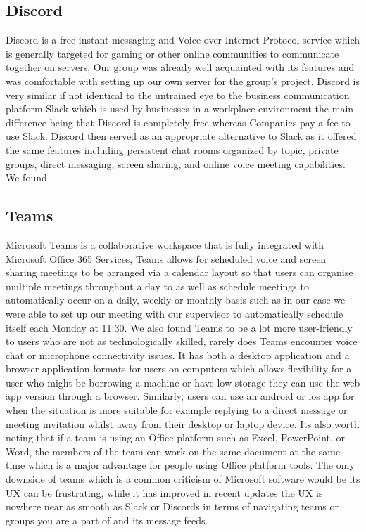 \subsection{Discord}
Discord is a free instant messaging and Voice over Internet Protocol service which is generally targeted for gaming or other online communities to communicate together on servers. Our group was already well acquainted with its features and was comfortable with setting up our own server for the group's project. Discord is very similar if not identical to the untrained eye to the business communication platform Slack which is used by businesses in a workplace environment the main difference being that Discord is completely free whereas Companies pay a fee to use Slack. Discord then served as an appropriate alternative to Slack as it offered the same features including persistent chat rooms organized by topic, private groups, direct messaging, screen sharing, and online voice meeting capabilities.
\newline
\newline
We found
\subsection{Teams}
Microsoft Teams is a collaborative workspace that is fully integrated with Microsoft Office 365 Services, Teams allows for scheduled voice and screen sharing meetings to be arranged via a calendar layout so that users can organise multiple meetings throughout a day to as well as schedule meetings to automatically occur on a daily, weekly or monthly basis such as in our case we were able to set up our meeting with our supervisor to automatically schedule itself each Monday at 11:30.
\newline
\newline
We also found Teams to be a lot more user-friendly to users who are not as technologically skilled, rarely does Teams encounter voice chat or microphone connectivity issues. It has both a desktop application and a browser application formats for users on computers which allows flexibility for a user who might be borrowing a machine or have low storage they can use the web app version through a browser.
\newline
\newline
Similarly, users can use an android or ios app for when the situation is more suitable for example replying to a direct message or meeting invitation whilst away from their desktop or laptop device. Its also worth noting that if a team is using an Office platform such as Excel, PowerPoint, or Word, the members of the team can work on the same document at the same time which is a major advantage for people using Office platform tools. The only downside of teams which is a common criticism of Microsoft software would be its UX can be frustrating, while it has improved in recent updates the UX is nowhere near as smooth as Slack or Discords in terms of navigating teams or groups you are a part of and its message feeds.

